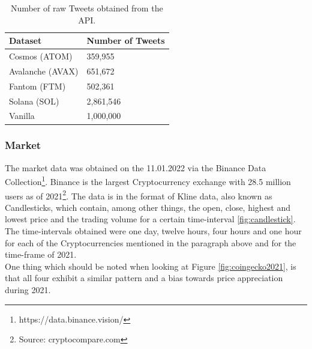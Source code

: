 \documentclass[11pt]{article}
\begin{document}
\begin{table}
\renewcommand{\arraystretch}{1.2}
\centering
\caption{\label{table:tweet-counts} Number of raw Tweets obtained from the API.}
\begin{tabular}{ll}
\textbf{Dataset} & \textbf{Number of Tweets}  \\ \midrule
Cosmos (ATOM) & 359,955   \\  
Avalanche (AVAX) & 651,672 \\
Fantom (FTM) &  502,361 \\
Solana (SOL) &  2,861,546 \\
Vanilla & 1,000,000 \\
\bottomrule
\end{tabular}
\end{table}

\subsubsection{Market}
The market data was obtained on the 11.01.2022 via the Binance Data Collection\footnote{https://data.binance.vision/}. Binance is the largest Cryptocurrency exchange with 28.5 million users as of 2021\footnote{Source: cryptocompare.com}. The data is in the format of Kline data, also known as Candlesticks, which contain, among other things, the open, close, highest and lowest price and the trading volume for a certain time-interval \ref{fig:candlestick}. The time-intervals obtained were one day, twelve hours, four hours and one hour for each of the Cryptocurrencies mentioned in the paragraph above and for the time-frame of 2021. \\
One thing which should be noted when looking at Figure \ref{fig:coingecko2021}, is that all four exhibit a similar pattern and a bias towards price appreciation during 2021. \\
\end{document}
